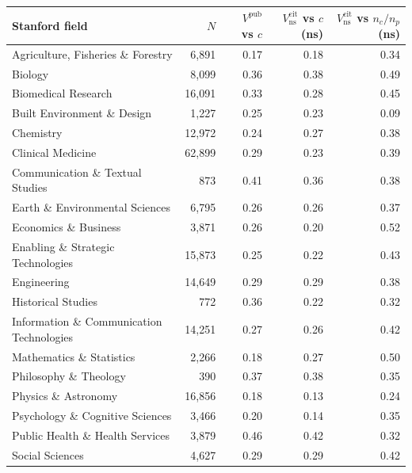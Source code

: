 \begin{tabular}{lrrrr}
\toprule
Stanford field & $N$ & $V^{\mathrm{pub}}$ vs $c$ & $V^{\mathrm{cit}}_{\mathrm{ns}}$ vs $c$ (ns) & $V^{\mathrm{cit}}_{\mathrm{ns}}$ vs $n_c/n_p$ (ns) \\
\midrule
Agriculture, Fisheries \& Forestry & 6{,}891 & 0.17 & 0.18 & 0.34 \\
Biology & 8{,}099 & 0.36 & 0.38 & 0.49 \\
Biomedical Research & 16{,}091 & 0.33 & 0.28 & 0.45 \\
Built Environment \& Design & 1{,}227 & 0.25 & 0.23 & 0.09 \\
Chemistry & 12{,}972 & 0.24 & 0.27 & 0.38 \\
Clinical Medicine & 62{,}899 & 0.29 & 0.23 & 0.39 \\
Communication \& Textual Studies & 873 & 0.41 & 0.36 & 0.38 \\
Earth \& Environmental Sciences & 6{,}795 & 0.26 & 0.26 & 0.37 \\
Economics \& Business & 3{,}871 & 0.26 & 0.20 & 0.52 \\
Enabling \& Strategic Technologies & 15{,}873 & 0.25 & 0.22 & 0.43 \\
Engineering & 14{,}649 & 0.29 & 0.29 & 0.38 \\
Historical Studies & 772 & 0.36 & 0.22 & 0.32 \\
Information \& Communication Technologies & 14{,}251 & 0.27 & 0.26 & 0.42 \\
Mathematics \& Statistics & 2{,}266 & 0.18 & 0.27 & 0.50 \\
Philosophy \& Theology & 390 & 0.37 & 0.38 & 0.35 \\
Physics \& Astronomy & 16{,}856 & 0.18 & 0.13 & 0.24 \\
Psychology \& Cognitive Sciences & 3{,}466 & 0.20 & 0.14 & 0.35 \\
Public Health \& Health Services & 3{,}879 & 0.46 & 0.42 & 0.32 \\
Social Sciences & 4{,}627 & 0.29 & 0.29 & 0.42 \\
\bottomrule
\end{tabular}
